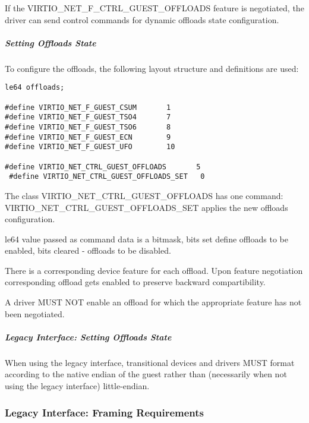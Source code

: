 If the VIRTIO_NET_F_CTRL_GUEST_OFFLOADS feature is negotiated, the driver can
send control commands for dynamic offloads state configuration.

\subparagraph{Setting Offloads State}\label{sec:Device Types / Network Device / Device Operation / Control Virtqueue / Offloads State Configuration / Setting Offloads State}

To configure the offloads, the following layout structure and
definitions are used:

\begin{lstlisting}
le64 offloads;

#define VIRTIO_NET_F_GUEST_CSUM       1
#define VIRTIO_NET_F_GUEST_TSO4       7
#define VIRTIO_NET_F_GUEST_TSO6       8
#define VIRTIO_NET_F_GUEST_ECN        9
#define VIRTIO_NET_F_GUEST_UFO        10

#define VIRTIO_NET_CTRL_GUEST_OFFLOADS       5
 #define VIRTIO_NET_CTRL_GUEST_OFFLOADS_SET   0
\end{lstlisting}

The class VIRTIO_NET_CTRL_GUEST_OFFLOADS has one command:
VIRTIO_NET_CTRL_GUEST_OFFLOADS_SET applies the new offloads configuration.

le64 value passed as command data is a bitmask, bits set define
offloads to be enabled, bits cleared - offloads to be disabled.

There is a corresponding device feature for each offload. Upon feature
negotiation corresponding offload gets enabled to preserve backward
compartibility.


A driver MUST NOT enable an offload for which the appropriate feature
has not been negotiated.

\subparagraph{Legacy Interface: Setting Offloads State}\label{sec:Device Types / Network Device / Device Operation / Control Virtqueue / Offloads State Configuration / Setting Offloads State / Legacy Interface: Setting Offloads State}
When using the legacy interface, transitional devices and drivers
MUST format 
according to the native endian of the guest rather than
(necessarily when not using the legacy interface) little-endian.


\subsubsection{Legacy Interface: Framing Requirements}\label{sec:Device
Types / Network Device / Legacy Interface: Framing Requirements}

